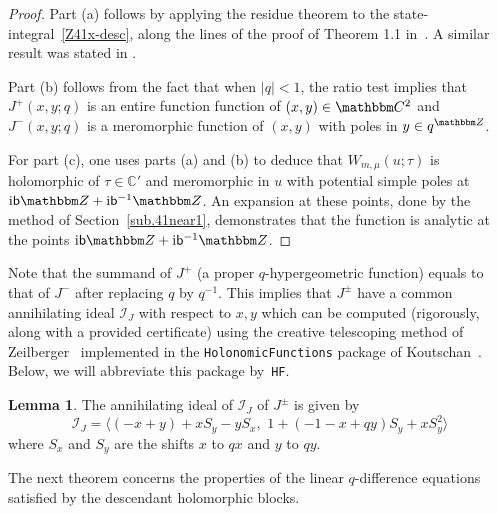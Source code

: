 \documentclass[12pt,reqno]{amsart}
\theoremstyle{definition}
\newtheorem{lemma}[theorem]{Lemma}
\def\BZ{\mathbbm Z}
\def\BC{\mathbbm C}
\def\calI{\mathcal I}
\def\calI{\mathcal I}
\def\bb{\mathsf{b}}
\def\ri{\mathrm{i}}
\def\ri{{\rm i}}
\def\IC{\mathbb{C}}
\begin{document}
\begin{proof}
  Part (a) follows by applying the residue theorem to the
  state-integral~\eqref{Z41x-desc}, along the lines of the proof of
  Theorem 1.1 in~\cite{GK:qseries}. A similar result was stated in
  \cite{dimofte-state}.

  Part (b) follows from the fact that when $|q|<1$, the ratio test
  implies that $J^+(x,y;q)$ is an entire function function of
  $(x,y) \in \BC^2$ and $J^-(x,y;q)$ is a meromorphic function of
  $(x,y)$ with poles in $y \in q^{\BZ}$.

  For part (c), one uses parts (a) and (b) to deduce that
  $W_{m,\mu}(u;\tau)$ is holomorphic of $\tau\in \IC'$ and meromorphic in
  $u$ with potential simple poles at $\ri \bb \BZ + \ri \bb^{-1} \BZ$.
  An expansion at these points, done by the method of
  Section~\ref{sub.41near1}, demonstrates that the function is analytic
  at the points $\ri \bb \BZ + \ri \bb^{-1} \BZ$.
\end{proof}

Note that the summand of $J^+$ (a proper $q$-hypergeometric function)
equals to that of $J^-$ after replacing $q$ by $q^{-1}$. This implies
that $J^\pm$ have a common annihilating ideal $\calI_J$ with respect
to $x,y$ which can be computed (rigorously, along with a provided
certificate) using the creative telescoping method of
Zeilberger~\cite{PWZ} implemented in the \texttt{HolonomicFunctions}
package of Koutschan~\cite{Koutschan,Koutschan:holofunctions}.  Below,
we will abbreviate this package by~\texttt{HF}.

\begin{lemma}  
  \label{lem.annJ}
  The annihilating ideal of $\calI_J$ of $J^\pm$ is given by
  \begin{equation}
    \label{annJ}
    \calI_J = \langle
    (-x + y) + x S_y - y S_x, \,\, 1 + (-1 - x + q y) S_y + x S_y^2
    \rangle
  \end{equation}
  where $S_x$ and $S_y$ are the shifts $x$ to $qx$ and $y$ to $qy$.
\end{lemma}

The next theorem concerns the properties of the linear $q$-difference
equations satisfied by the descendant holomorphic blocks.
\end{document}
